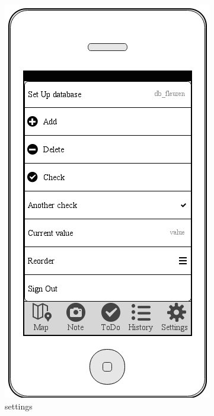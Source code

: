 \documentclass[12pt]{article}
\begin{document}
\begin{figure}[ht]
\centering
\includegraphics[width=\linewidth, height=0.4\textheight, keepaspectratio=true]{mockups/settings.png}
\caption{settings}
\endminipage\hfill
\end{figure}
\end{document}
